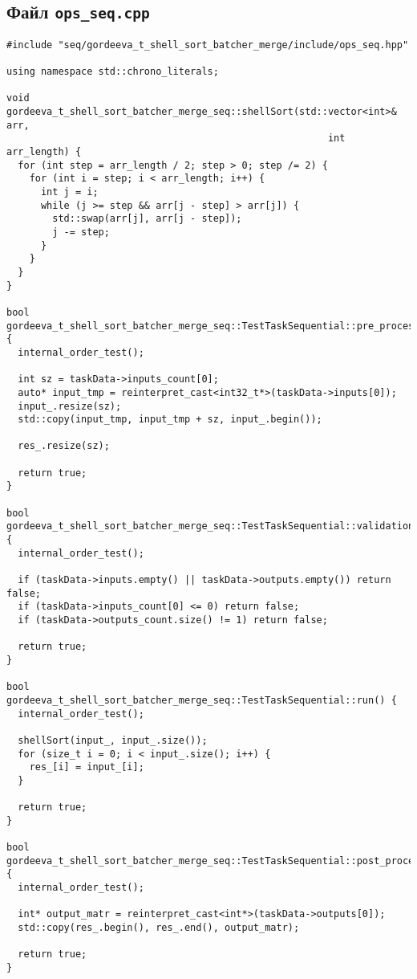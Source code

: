 \documentclass[a4paper,12pt]{article}
\begin{document}
\subsection{Файл \texttt{ops\_seq.cpp}}
\begin{verbatim}
#include "seq/gordeeva_t_shell_sort_batcher_merge/include/ops_seq.hpp"

using namespace std::chrono_literals;

void gordeeva_t_shell_sort_batcher_merge_seq::shellSort(std::vector<int>& arr,
                                                        int arr_length) {
  for (int step = arr_length / 2; step > 0; step /= 2) {
    for (int i = step; i < arr_length; i++) {
      int j = i;
      while (j >= step && arr[j - step] > arr[j]) {
        std::swap(arr[j], arr[j - step]);
        j -= step;
      }
    }
  }
}

bool gordeeva_t_shell_sort_batcher_merge_seq::TestTaskSequential::pre_processing() {
  internal_order_test();

  int sz = taskData->inputs_count[0];
  auto* input_tmp = reinterpret_cast<int32_t*>(taskData->inputs[0]);
  input_.resize(sz);
  std::copy(input_tmp, input_tmp + sz, input_.begin());

  res_.resize(sz);

  return true;
}

bool gordeeva_t_shell_sort_batcher_merge_seq::TestTaskSequential::validation() {
  internal_order_test();

  if (taskData->inputs.empty() || taskData->outputs.empty()) return false;
  if (taskData->inputs_count[0] <= 0) return false;
  if (taskData->outputs_count.size() != 1) return false;

  return true;
}

bool gordeeva_t_shell_sort_batcher_merge_seq::TestTaskSequential::run() {
  internal_order_test();

  shellSort(input_, input_.size());
  for (size_t i = 0; i < input_.size(); i++) {
    res_[i] = input_[i];
  }

  return true;
}

bool gordeeva_t_shell_sort_batcher_merge_seq::TestTaskSequential::post_processing() {
  internal_order_test();

  int* output_matr = reinterpret_cast<int*>(taskData->outputs[0]);
  std::copy(res_.begin(), res_.end(), output_matr);

  return true;
}
\end{verbatim}
\end{document}
